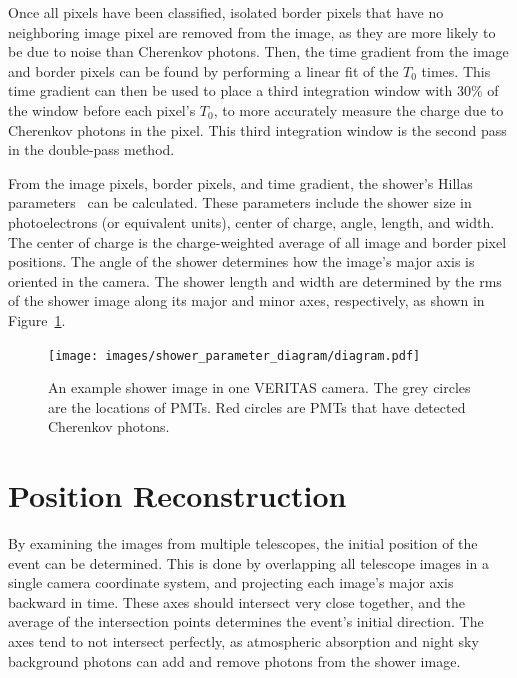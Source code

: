   Once all pixels have been classified, isolated border pixels that have no neighboring image pixel are removed from the image, as they are more likely to be due to noise than Cherenkov photons.
  Then, the time gradient from the image and border pixels can be found by performing a linear fit of the $T_{0}$ times.
  This time gradient can then be used to place a third integration window 
with 30\% of the window before each pixel's $T_{0}$, to more accurately measure the charge due to Cherenkov photons in the pixel.
  This third integration window is the second pass in the double-pass method.

  From the image pixels, border pixels, and time gradient, the shower's Hillas parameters~\cite{hillas_params} can be calculated.
  These parameters include the shower size in photoelectrons (or equivalent units), center of charge, angle, length, and width.
  The center of charge is the charge-weighted average of all image and border pixel positions.
  The angle of the shower determines how the image's major axis is oriented in the camera.
  The shower length and width are determined by the rms of the shower image along its major and minor axes, respectively, as shown in Figure~\ref{fig:shower_param}.
  
  \begin{figure}[b]
    \centering
    \texttt{[image: images/shower\_parameter\_diagram/diagram.pdf]}
    \caption[Basic Shower Diagram]{
      An example shower image in one VERITAS camera.
      The grey circles are the locations of PMTs.
      Red circles are PMTs that have detected Cherenkov photons.
    }
    \label{fig:shower_param}
  \end{figure}
  \FloatBarrier
  
  

\section{Position Reconstruction}\label{subsec:posrecon}
  By examining the images from multiple telescopes, the initial position of the event can be determined.
  This is done by overlapping all telescope images in a single camera coordinate system, and projecting each image's major axis backward in time.
  These axes should intersect very close together, and the average of the intersection points determines the event's initial direction.
  The axes tend to not intersect perfectly, as atmospheric absorption and night sky background photons can add and remove photons from the shower image.
  
